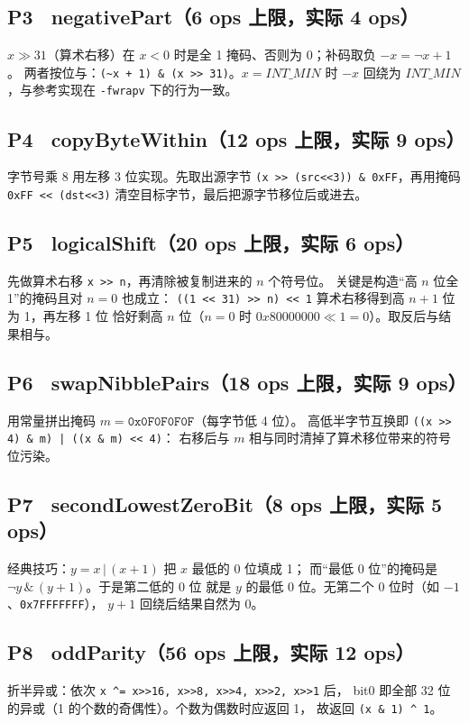 \documentclass[11pt]{ctexart}
\begin{document}
\subsection{P3 \ negativePart（6 ops 上限，实际 4 ops）}
$x \gg 31$（算术右移）在 $x<0$ 时是全 1 掩码、否则为 0；补码取负 $-x=\lnot x+1$。
两者按位与：\lstinline|(~x + 1) & (x >> 31)|。$x=\mathit{INT\_MIN}$ 时
$-x$ 回绕为 $\mathit{INT\_MIN}$，与参考实现在 \texttt{-fwrapv} 下的行为一致。

\subsection{P4 \ copyByteWithin（12 ops 上限，实际 9 ops）}
字节号乘 8 用左移 3 位实现。先取出源字节
\lstinline|(x >> (src<<3)) & 0xFF|，再用掩码 \lstinline|0xFF << (dst<<3)|
清空目标字节，最后把源字节移位后或进去。

\subsection{P5 \ logicalShift（20 ops 上限，实际 6 ops）}
先做算术右移 \lstinline|x >> n|，再清除被复制进来的 $n$ 个符号位。
关键是构造``高 $n$ 位全 1''的掩码且对 $n=0$ 也成立：
\lstinline|((1 << 31) >> n) << 1| 算术右移得到高 $n{+}1$ 位为 1，再左移 1 位
恰好剩高 $n$ 位（$n=0$ 时 $0x80000000 \ll 1 = 0$）。取反后与结果相与。

\subsection{P6 \ swapNibblePairs（18 ops 上限，实际 9 ops）}
用常量拼出掩码 $m=\texttt{0x0F0F0F0F}$（每字节低 4 位）。
高低半字节互换即 \lstinline!((x >> 4) & m) | ((x & m) << 4)!：
右移后与 $m$ 相与同时清掉了算术移位带来的符号位污染。

\subsection{P7 \ secondLowestZeroBit（8 ops 上限，实际 5 ops）}
经典技巧：$y = x \,\vert\, (x+1)$ 把 $x$ 最低的 0 位填成 1；
而``最低 0 位''的掩码是 $\lnot y \,\&\, (y+1)$。于是第二低的 0 位
就是 $y$ 的最低 0 位。无第二个 0 位时（如 $-1$、\texttt{0x7FFFFFFF}），
$y+1$ 回绕后结果自然为 0。

\subsection{P8 \ oddParity（56 ops 上限，实际 12 ops）}
折半异或：依次 \lstinline|x ^= x>>16, x>>8, x>>4, x>>2, x>>1| 后，
bit0 即全部 32 位的异或（1 的个数的奇偶性）。个数为偶数时应返回 1，
故返回 \lstinline|(x & 1) ^ 1|。
\end{document}
